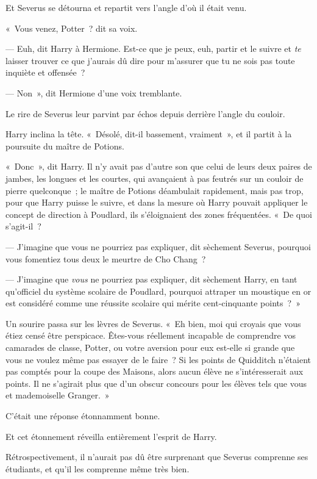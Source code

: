 Et Severus se détourna et repartit vers l'angle d'où il était venu.

«~Vous venez, Potter~? dit sa voix.

--- Euh, dit Harry à Hermione. Est-ce que je peux, euh, partir et le suivre et \emph{te} laisser trouver ce que j'aurais dû dire pour m'assurer que tu ne sois pas toute inquiète et offensée~?

--- Non~», dit Hermione d'une voix tremblante.

Le rire de Severus leur parvint par échos depuis derrière l'angle du couloir.

Harry inclina la tête. «~Désolé, dit-il bassement, vraiment~», et il partit à la poursuite du maître de Potions.

\later

«~Donc~», dit Harry. Il n'y avait pas d'autre son que celui de leurs deux paires de jambes, les longues et les courtes, qui avançaient à pas feutrés sur un couloir de pierre quelconque~; le maître de Potions déambulait rapidement, mais pas trop, pour que Harry puisse le suivre, et dans la mesure où Harry pouvait appliquer le concept de direction à Poudlard, ils s'éloignaient des zones fréquentées. «~De quoi s'agit-il~?

--- J'imagine que vous ne pourriez pas expliquer, dit sèchement Severus, pourquoi vous fomentiez tous deux le meurtre de Cho Chang~?

--- J'imagine que \emph{vous} ne pourriez pas expliquer, dit sèchement Harry, en tant qu'officiel du système scolaire de Poudlard, pourquoi attraper un moustique en or est considéré comme une réussite scolaire qui mérite cent-cinquante points~?~»

Un sourire passa sur les lèvres de Severus. «~Eh bien, moi qui croyais que vous étiez censé être perspicace. Êtes-vous réellement incapable de comprendre vos camarades de classe, Potter, ou votre aversion pour eux est-elle si grande que vous ne voulez même pas essayer de le faire~? Si les points de Quidditch n'étaient pas comptés pour la coupe des Maisons, alors aucun élève ne s'intéresserait aux points. Il ne s'agirait plus que d'un obscur concours pour les élèves tels que vous et mademoiselle Granger.~»

C'était une réponse étonnamment bonne.

Et cet étonnement réveilla entièrement l'esprit de Harry.

Rétrospectivement, il n'aurait pas dû être surprenant que Severus comprenne ses étudiants, et qu'il les comprenne même très bien.

